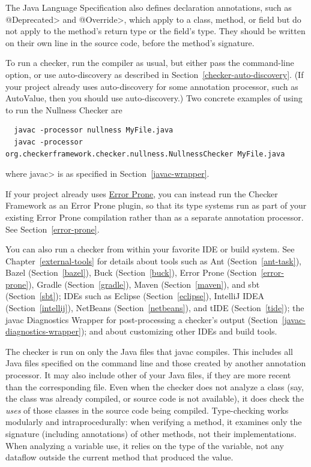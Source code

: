 The Java Language Specification also defines
declaration annotations, such as \<@Deprecated> and \<@Override>, which apply
to a class, method, or field but do not apply to the method's return type
or the field's type.  They should be written on their own line in the
source code, before the method's signature.



To run a checker, run the compiler  as usual,
but either pass the  command-line
option, or use auto-discovery as described in
Section~\ref{checker-auto-discovery}.
(If your project already uses auto-discovery for some annotation processor,
such as AutoValue, then you should use auto-discovery.)
Two concrete examples of using  to run the Nullness Checker are

\begin{Verbatim}
  javac -processor nullness MyFile.java
  javac -processor org.checkerframework.checker.nullness.NullnessChecker MyFile.java
\end{Verbatim}

\noindent
where \<javac> is as specified in Section~\ref{javac-wrapper}.

If your project already uses \href{https://errorprone.info/}{Error Prone}, you can instead
run the Checker Framework as an Error Prone plugin, so that its type systems run as part of
your existing Error Prone compilation rather than as a separate annotation processor.  See
Section~\ref{error-prone}.

You can also run a checker from within your favorite IDE or build system.  See
Chapter~\ref{external-tools} for details about tools such as
Ant (Section~\ref{ant-task}),
Bazel (Section~\ref{bazel}),
Buck (Section~\ref{buck}),
Error Prone (Section~\ref{error-prone}),
Gradle (Section~\ref{gradle}),
Maven (Section~\ref{maven}), and
sbt (Section~\ref{sbt});
IDEs such as
Eclipse (Section~\ref{eclipse}),
IntelliJ IDEA (Section~\ref{intellij}),
NetBeans (Section~\ref{netbeans}),
and
tIDE (Section~\ref{tide});
the javac Diagnostics Wrapper for post-processing a checker's output
(Section~\ref{javac-diagnostics-wrapper});
and about customizing other IDEs and build tools.

The checker is run on only the Java files that javac compiles.
This includes all Java files specified on the command line and those
created by another annotation processor.  It may also include other of
your Java files, if they are more recent than the corresponding  file.
Even when the checker does not analyze a class (say, the class was
already compiled, or source code is not available), it does check
the \emph{uses} of those classes in the source code being compiled.
Type-checking works modularly and intraprocedurally:  when verifying a
method, it examines only the signature (including annotations) of other
methods, not their implementations.  When analyzing a variable use, it
relies on the type of the variable, not any dataflow outside the current
method that produced the value.

